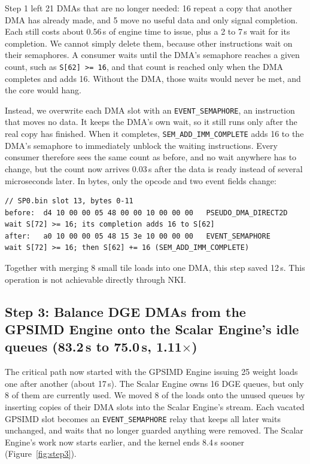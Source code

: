 \documentclass{article}
\newcommand{\us}{\,\textmu{}s\xspace}
\newcommand{\code}[1]{\texttt{#1}}
\begin{document}
Step 1 left 21 DMAs that are no longer needed: 16 repeat a copy that another DMA has already made, and 5 move no useful data and only signal completion. Each still costs about 0.56\us of engine time to issue, plus a 2 to 7\us wait for its completion. We cannot simply delete them, because other instructions wait on their semaphores. A consumer waits until the DMA's semaphore reaches a given count, such as \code{S[62] >= 16}, and that count is reached only when the DMA completes and adds 16. Without the DMA, those waits would never be met, and the core would hang.

Instead, we overwrite each DMA slot with an \code{EVENT\_SEMAPHORE}, an instruction that moves no data. It keeps the DMA's own wait, so it still runs only after the real copy has finished. When it completes, \code{SEM\_ADD\_IMM\_COMPLETE} adds 16 to the DMA's semaphore to immediately unblock the waiting instructions. Every consumer therefore sees the same count as before, and no wait anywhere has to change, but the count now arrives 0.03\us after the data is ready instead of several microseconds later. In bytes, only the opcode and two event fields change:

\begin{lstlisting}
// SP0.bin slot 13, bytes 0-11
before:  d4 10 00 00 05 48 00 00 10 00 00 00   PSEUDO_DMA_DIRECT2D  wait S[72] >= 16; its completion adds 16 to S[62]
after:   a0 10 00 00 05 48 15 3e 10 00 00 00   EVENT_SEMAPHORE      wait S[72] >= 16; then S[62] += 16 (SEM_ADD_IMM_COMPLETE)
\end{lstlisting}

Together with merging 8 small tile loads into one DMA, this step saved 12\us. This operation is not achievable directly through NKI.

\subsection{Step 3: Balance DGE DMAs from the GPSIMD Engine onto the Scalar Engine's idle queues (83.2\texorpdfstring{\us}{ us} to 75.0\texorpdfstring{\us}{ us}, 1.11\texorpdfstring{$\times$}{x})}

The critical path now started with the GPSIMD Engine issuing 25 weight loads one after another (about 17\us). The Scalar Engine owns 16 DGE queues, but only 8 of them are currently used. We moved 8 of the loads onto the unused queues by inserting copies of their DMA slots into the Scalar Engine's stream. Each vacated GPSIMD slot becomes an \code{EVENT\_SEMAPHORE} relay that keeps all later waits unchanged, and waits that no longer guarded anything were removed. The Scalar Engine's work now starts earlier, and the kernel ends 8.4\us sooner (Figure~\ref{fig:step3}).
\end{document}
